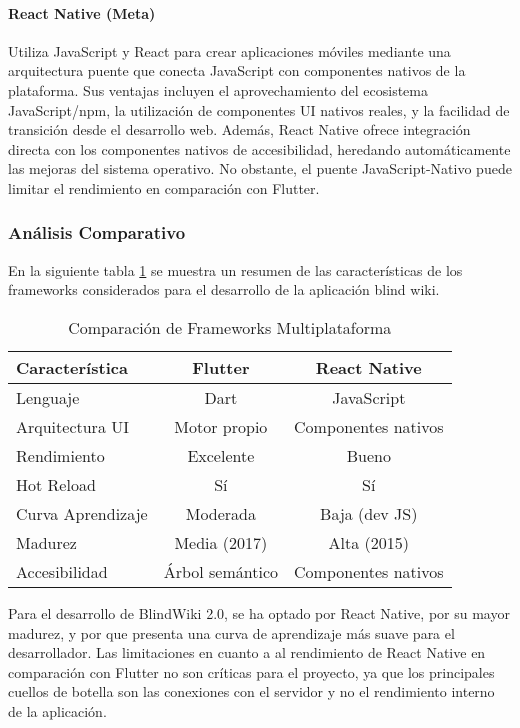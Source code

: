 \paragraph{React Native (Meta)}
Utiliza JavaScript y React para crear aplicaciones móviles mediante una arquitectura puente que conecta JavaScript con componentes nativos de la plataforma. Sus ventajas incluyen el aprovechamiento del ecosistema JavaScript/npm, la utilización de componentes UI nativos reales, y la facilidad de transición desde el desarrollo web. Además, React Native ofrece integración directa con los componentes nativos de accesibilidad, heredando automáticamente las mejoras del sistema operativo. No obstante, el puente JavaScript-Nativo puede limitar el rendimiento en comparación con Flutter.


\subsubsection{Análisis Comparativo}
En la siguiente tabla \ref{tab:framework-comparison} se muestra un resumen de las características de los frameworks considerados para el desarrollo de la aplicación blind wiki.
\begin{table}[h]
    \centering
    \caption{Comparación de Frameworks Multiplataforma}
    \label{tab:framework-comparison}
    \begin{tabular}{|l|c|c|}
        \hline
        \textbf{Característica} & \textbf{Flutter} & \textbf{React Native} \\
        \hline
        Lenguaje & Dart & JavaScript \\
        \hline
        Arquitectura UI & Motor propio & Componentes nativos \\
        \hline
        Rendimiento & Excelente & Bueno \\
        \hline
        Hot Reload & Sí & Sí \\
        \hline
        Curva Aprendizaje & Moderada & Baja (dev JS) \\
        \hline
        Madurez & Media (2017) & Alta (2015) \\
        \hline
        Accesibilidad & Árbol semántico & Componentes nativos \\
        \hline
    \end{tabular}
\end{table}

Para el desarrollo de BlindWiki 2.0, se ha optado por React Native, por su mayor madurez, y por que presenta una curva de aprendizaje más suave para el desarrollador. Las limitaciones en cuanto a al rendimiento de React Native en comparación con Flutter no son críticas para el proyecto, ya que los principales cuellos de botella son las conexiones con el servidor y no el rendimiento interno de la aplicación.

